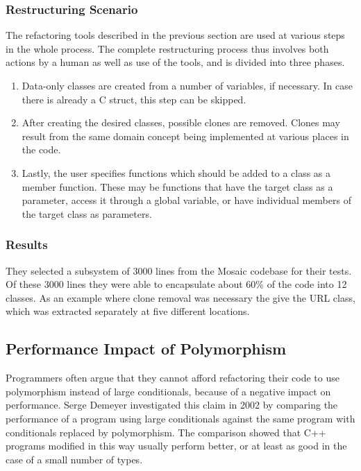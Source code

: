 \documentclass[conference,compsoc,a4paper]{IEEEtran}
\newcommand{\code}[1]{{\small\ttfamily #1}}
\begin{document}
\subsubsection{Restructuring Scenario}

The refactoring tools described in the previous section are used at various steps in the whole process. The complete 
restructuring process thus involves both actions by a human as well as use of the tools, and is divided into three 
phases.

\begin{enumerate}
  \item Data-only classes are created from a number of variables, if necessary. In case there is already a C 
  \code{struct}, this step can be skipped.
  
  \item After creating the desired classes, possible clones are removed. Clones may result from the same domain concept 
  being implemented at various places in the code.
  
  \item Lastly, the user specifies functions which should be added to a class as a member function. These may be 
  functions that have the target class as a parameter, access it through a global variable, or have individual members 
  of the target class as parameters.
\end{enumerate}

\subsubsection{Results}

They selected a subsystem of 3000 lines from the Mosaic codebase for their tests. Of these 3000 lines they were able to 
encapsulate about 60\% of the code into 12 classes. As an example where clone removal was necessary the give the URL 
class, which was extracted separately at five different locations.

\subsection{Performance Impact of Polymorphism} \label{sec:polymorphism}

Programmers often argue that they cannot afford refactoring their code to use polymorphism instead of large 
conditionals, because of a negative impact on performance. Serge Demeyer investigated this claim in 2002 
\cite{polymorphism} by comparing the performance of a program using large conditionals against the same program with 
conditionals replaced by polymorphism. The comparison showed that C++ programs modified in this way usually perform 
better, or at least as good in the case of a small number of types.
\end{document}
